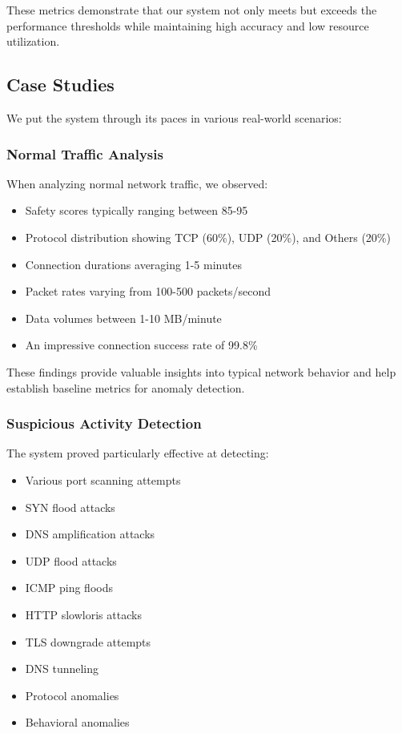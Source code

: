 \documentclass[conference]{IEEEtran}
\begin{document}
These metrics demonstrate that our system not only meets but exceeds the performance thresholds while maintaining high accuracy and low resource utilization.

\subsection{Case Studies}
We put the system through its paces in various real-world scenarios:

\subsubsection{Normal Traffic Analysis}
When analyzing normal network traffic, we observed:
\begin{itemize}[leftmargin=*]
    \item Safety scores typically ranging between 85-95
    \item Protocol distribution showing TCP (60\%), UDP (20\%), and Others (20\%)
    \item Connection durations averaging 1-5 minutes
    \item Packet rates varying from 100-500 packets/second
    \item Data volumes between 1-10 MB/minute
    \item An impressive connection success rate of 99.8\%
\end{itemize}

These findings provide valuable insights into typical network behavior and help establish baseline metrics for anomaly detection.

\subsubsection{Suspicious Activity Detection}
The system proved particularly effective at detecting:
\begin{itemize}[leftmargin=*]
    \item Various port scanning attempts
    \item SYN flood attacks
    \item DNS amplification attacks
    \item UDP flood attacks
    \item ICMP ping floods
    \item HTTP slowloris attacks
    \item TLS downgrade attempts
    \item DNS tunneling
    \item Protocol anomalies
    \item Behavioral anomalies
\end{itemize}
\end{document}
